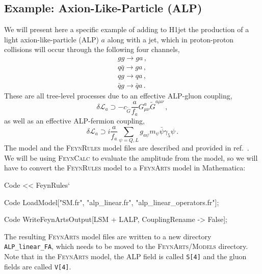 \documentclass[12pt,a4wide]{article}
\begin{document}
\subsection{Example: Axion-Like-Particle (ALP)}
We will present here a specific example of adding to H1jet the production of a light axion-like-particle (ALP) $a$ along with a jet, which in proton-proton collisions will occur through the following four channels, 
\begin{equation}
    \begin{split}
	g g \rightarrow g a \,, \\
	q \bar{q} \rightarrow g a \,, \\ 
	q g \rightarrow q a \,, \\ 
	\bar{q} g \rightarrow \bar{q} a \,.
	\end{split}
\end{equation}
These are all tree-level processes due to an effective ALP-gluon coupling, 
\begin{equation}
   \delta \mathcal{L}_a \supset -c_{\tilde{G}}\frac{a}{f_a} G_{\mu\nu}^{a} \tilde{G}^{a \mu\nu} \,, \label{eq:ggacoupling}
\end{equation}
as well as an effective ALP-fermion coupling, 
\begin{equation}
	\delta \mathcal{L}_a \supset i \frac{a}{f_a} \sum_{\psi = Q, L} g_{a \psi} m_{\psi} \bar{\psi} \gamma_{5} \psi \,. \label{eq:apsicoupling} 
\end{equation}
The model and the \textsc{FeynRules} \cite{bib:feynrules} model files are described and provided in ref.\ \cite{bib:alp}. We will be using \textsc{FeynCalc} \cite{bib:feyncalc} to evaluate the amplitude from the model, so we will have to convert the \textsc{FeynRules} model to a \textsc{FeynArts} \cite{bib:feynarts} model in Mathematica: 
\begin{mmaCell}{Code}
<< FeynRules` 
\end{mmaCell}
\begin{mmaCell}{Code}
LoadModel["SM.fr", "alp_linear.fr", "alp_linear_operators.fr"];  
\end{mmaCell}
\begin{mmaCell}{Code}
WriteFeynArtsOutput[LSM + LALP, CouplingRename -> False]; 
\end{mmaCell}
The resulting \textsc{FeynArts} model files are written to a new directory \texttt{ALP\_linear\_FA}, which needs to be moved to the \textsc{FeynArts/Models} directory. Note that in the \textsc{FeynArts} model, the ALP field is called \texttt{S[4]} and the gluon fields are called \texttt{V[4]}. 
\end{document}
